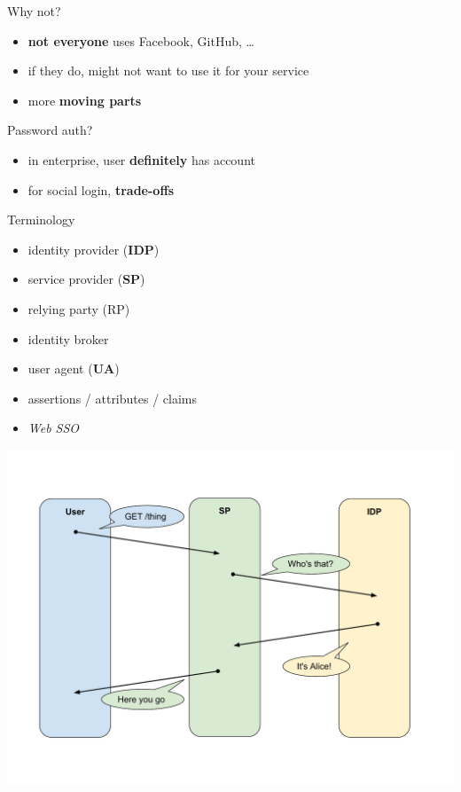 \documentclass[ignorenonframetext,aspectratio=169]{beamer}
\providecommand{\tightlist}{%
  \setlength{\itemsep}{0pt}\setlength{\parskip}{0pt}}
\begin{document}
\begin{frame}{Why not?}

\begin{itemize}
\tightlist
\item
    {\bf not everyone} uses Facebook, GitHub, \ldots{}
\item
  if they do, might not want to use it for your service
\item
    more {\bf moving parts}
\end{itemize}

\end{frame}

\begin{frame}{Password auth?}

\begin{itemize}
\tightlist
\item
    in enterprise, user \textbf{definitely} has account
\item
  for social login, \textbf{trade-offs}
\end{itemize}

\end{frame}

\begin{frame}{Terminology}

\begin{itemize}
\tightlist
\item
    identity provider ({\bf IDP})
\item
    service provider ({\bf SP})
\item
    relying party (RP)
\item
  identity broker
\item
    user agent ({\bf UA})
\item
  assertions / attributes / claims
\item {\em Web SSO}
\end{itemize}

\end{frame}

\begin{frame}[plain]
\centering
\includegraphics[height=\paperheight]{fedsso-basic.pdf}
\end{frame}
\end{document}
